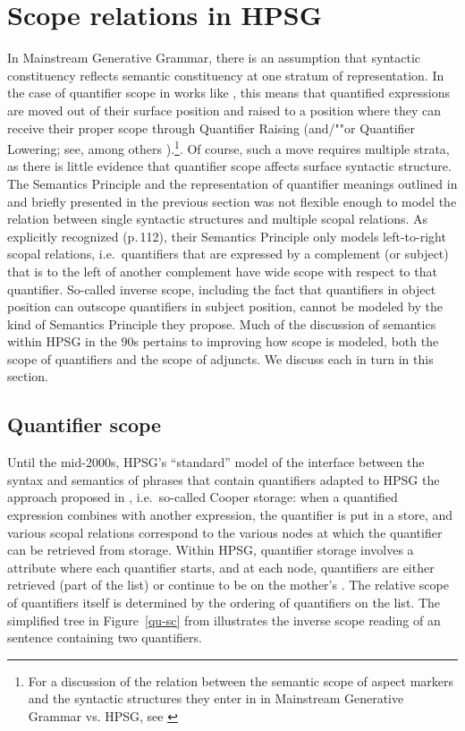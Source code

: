 \documentclass[output=paper,biblatex,babelshorthands,newtxmath,draftmode,colorlinks,citecolor=brown]{langscibook}
\begin{document}
\section{Scope relations in HPSG}
\label{sec-scope-in-hpsg}

In Mainstream Generative Grammar, there is an assumption that syntactic constituency reflects
semantic constituency at one stratum of representation. In the case of quantifier scope in works
like \citet{May1985}, this means that quantified expressions are moved out of their surface position
and raised to a position where they can receive their proper scope through Quantifier Raising
(and/""or Quantifier Lowering; see, among others \citealt{Hornstein1995}).\footnote{For a discussion
  of the relation between the semantic scope of aspect markers and the syntactic structures they
  enter in in Mainstream Generative Grammar vs. HPSG, see \citet{KoenigandMuansuwan2005}}. Of
course, such a move requires multiple strata, as there is little evidence that quantifier scope
affects surface syntactic structure. The Semantics Principle and the representation of quantifier
meanings outlined in \citet{PollardandSag1987} and briefly presented in the previous section was not
flexible enough to model the relation between single syntactic structures and multiple scopal
relations. As \citeauthor{PollardandSag1987} explicitly recognized (p.\,112), their Semantics
Principle only models left-to-right scopal relations, i.e.\ quantifiers that are expressed by a
complement (or subject) that is to the left of another complement have wide scope with respect to
that quantifier. So-called inverse scope, including the fact that quantifiers in object position can
outscope quantifiers in subject position, cannot be modeled by the kind of Semantics Principle they
propose. Much of the discussion of semantics within HPSG in the 90s pertains to improving how scope
is modeled, both the scope of quantifiers and the scope of adjuncts. We discuss each in turn in this
section.



\subsection{Quantifier scope}

\enlargethispage{4pt}
Until the mid-2000s, HPSG's ``standard'' model of the interface between the syntax and semantics of
phrases that contain quantifiers adapted to HPSG the approach proposed in
\citet{Cooper1975,Cooper1983}, i.e.\ so-called Cooper storage: when a quantified expression combines
with another expression, the quantifier is put in a store, and various scopal relations correspond
to the various nodes at which the quantifier can be retrieved from storage. Within HPSG, quantifier
storage involves a  attribute where each quantifier starts, and at each node,
quantifiers are either retrieved (part of the  list) or continue to be on the
mother's . The relative scope of quantifiers itself is determined by the ordering of
quantifiers on the  list. The simplified tree in Figure~\ref{qu-sc} from
\citet[324]{PollardandSag1994} illustrates the inverse scope reading of an  sentence
containing two quantifiers.
\end{document}
